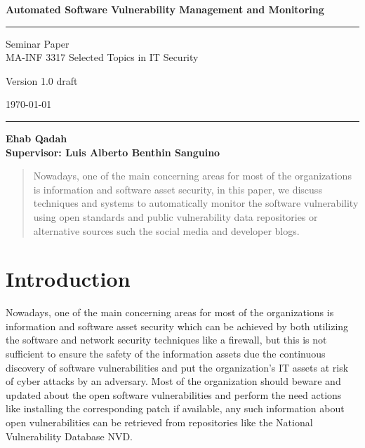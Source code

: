 \documentclass{llncs}
\begin{document}
\begin{flushleft}
 
\centering\LARGE {\bf Automated Software Vulnerability Management and Monitoring }


\rule{\textwidth}{1pt}

\vspace{2pt}


\centering
 Seminar Paper  
 \\MA-INF 3317 Selected Topics in IT Security

{\Large Version 1.0 draft }

\vspace{8pt}
\today

\end{flushleft}

\rule{\textwidth}{1pt}

\vspace{8 cm}

\centering
 \bf Ehab Qadah\\
 
 \vspace{7 pt}
\bf Supervisor: Luis Alberto Benthin Sanguino

\newpage

\tableofcontents

\newpage


\begin{abstract}
Nowadays, one of the main concerning areas for most of the organizations is information and software asset security, in this paper, we discuss techniques and systems to automatically monitor the software vulnerability using open standards and public vulnerability data repositories or alternative sources such the social media and developer blogs. 
\end{abstract}

\section{Introduction}

\par Nowadays, one of the main concerning areas for most of the organizations is information and software asset security which can be achieved by both utilizing the software and network security techniques like a firewall, but this is not sufficient to ensure the safety of the information assets due the continuous discovery of software vulnerabilities and put the organization's IT assets at risk of cyber attacks by an adversary. Most of the organization should beware and updated about the open software vulnerabilities and perform the need actions like installing the corresponding patch if available, any such information about open vulnerabilities can be retrieved from repositories like the National Vulnerability Database NVD.
 
\end{document}
